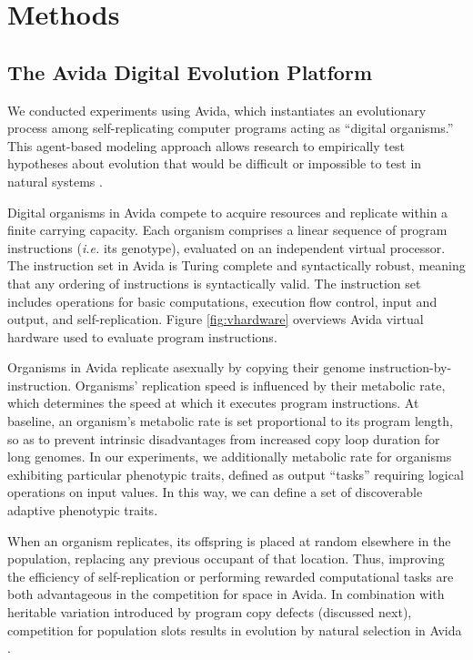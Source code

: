 \section{Methods} \label{sec:methods}

\subsection{The Avida Digital Evolution Platform}

We conducted experiments using Avida, which instantiates an evolutionary process among self-replicating computer programs acting as ``digital organisms.''
This agent-based modeling approach allows research to empirically test hypotheses about evolution that would be difficult or impossible to test in natural systems \citep{Ofria:2009avida}.



Digital organisms in Avida compete to acquire resources and replicate within a finite carrying capacity.
Each organism comprises a linear sequence of program instructions (\textit{i.e.} its genotype), evaluated on an independent virtual processor.
The instruction set in Avida is Turing complete and syntactically robust, meaning that any ordering of instructions is syntactically valid.
The instruction set includes operations for basic computations, execution flow control, input and output, and self-replication.
Figure \ref{fig:vhardware} overviews Avida virtual hardware used to evaluate program instructions.

Organisms in Avida replicate asexually by copying their genome instruction-by-instruction.
Organisms' replication speed is influenced by their metabolic rate, which determines the speed at which it executes program instructions.
At baseline, an organism's metabolic rate is set proportional to its program length, so as to prevent intrinsic disadvantages from increased copy loop duration for long genomes.
In our experiments, we additionally metabolic rate for organisms exhibiting particular phenotypic traits, defined as output ``tasks'' requiring logical operations on input values.
In this way, we can define a set of discoverable adaptive phenotypic traits.

When an organism replicates, its offspring is placed at random elsewhere in the population, replacing any previous occupant of that location.
Thus, improving the efficiency of self-replication or performing rewarded computational tasks are both advantageous in the competition for space in Avida.
In combination with heritable variation introduced by program copy defects (discussed next), competition for population slots results in evolution by natural selection in Avida \citep{pennock2007models}.

